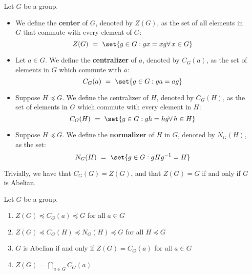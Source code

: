 \documentclass{article}
\begin{document}
\begin{defn}
Let $ G $ be a group.
\begin{itemize}
    \item We define the \textbf{center} of $ G $, denoted by $ Z(G) $, as the set of all elements in $ G $ that commute with every element of $ G $:
        \begin{equation*}
            Z(G) \ = \ \set{g \in G : gx = xg \forall \, x \in G}
        \end{equation*}
    \item Let $ a \in G $. We define the \textbf{centralizer} of $ a $, denoted by $ C_{G}(a) $, as the set of elements in $ G $ which commute with $ a $:
        \begin{equation*}
            C_{G}(a) \ = \ \set{g \in G : ga = ag}
        \end{equation*}
    \item Suppose $ H \preceq G $. We define the centralizer of $ H $, denoted by $ C_{G}(H) $, as the set of elements in $ G $ which commute with every element in $ H $:
        \begin{equation*}
            C_{G}(H) \ = \ \set{g \in G : gh = hg \forall \, h \in H}
        \end{equation*}
    \item Suppose $ H \preceq G $. We define the \textbf{normalizer} of $ H $ in $ G $, denoted by $ N_{G}(H) $, as the set:
        \begin{equation*}
            N_{G}(H) \ = \ \set{g \in G : gHg^{-1} = H}
        \end{equation*}
\end{itemize}
\end{defn}

Trivially, we have that $ C_{G}(G) = Z(G) $, and that $ Z(G) = G $ if and only if $ G $ is Abelian.

\begin{thm}
Let $ G $ be a group.
\begin{enumerate}
    \item $ Z(G) \preceq C_{G}(a) \preceq G $ for all $ a \in G $
    \item $ Z(G) \preceq C_{G}(H) \preceq N_{G}(H) \preceq G $ for all $ H \preceq G $
    \item $ G $ is Abelian if and only if $ Z(G) = C_{G}(a) $ for all $ a \in G $
    \item $ Z(G) = \displaystyle\bigcap\limits_{a \in G} C_{G}(a) $
\end{enumerate}
\end{thm}
\end{document}
